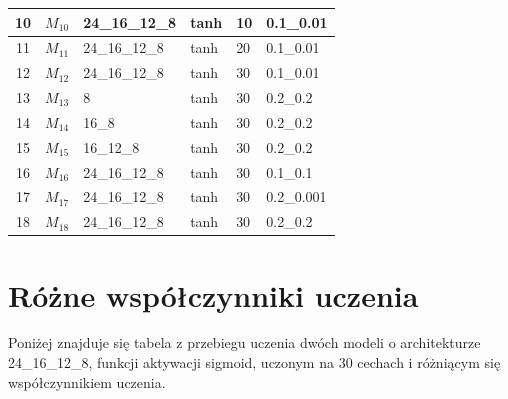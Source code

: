 \documentclass{report}
\begin{document}
\begin{minipage}{\textwidth}
\begin{longtable}{|c|l|l|l|l|l|}
                     10 & $M_{10}$ & 24\_16\_12\_8 & tanh & 10 & 0.1\_0.01 \\ \hline
                     11 & $M_{11}$ & 24\_16\_12\_8 & tanh & 20 & 0.1\_0.01 \\ \hline
                     12 & $M_{12}$ & 24\_16\_12\_8 & tanh & 30 & 0.1\_0.01 \\ \hline

                     13 & $M_{13}$ & 8 & tanh & 30 & 0.2\_0.2 \\ \hline
                     14 & $M_{14}$ & 16\_8 & tanh & 30 & 0.2\_0.2 \\ \hline
                     15 & $M_{15}$ & 16\_12\_8 & tanh & 30 & 0.2\_0.2 \\ \hline

                     16 & $M_{16}$ & 24\_16\_12\_8 & tanh & 30 & 0.1\_0.1 \\ \hline
                     17 & $M_{17}$ & 24\_16\_12\_8 & tanh & 30 & 0.2\_0.001 \\ \hline
                     18 & $M_{18}$ & 24\_16\_12\_8 & tanh & 30 & 0.2\_0.2 \\ \hline
                 \end{longtable}
    \end{minipage}

    \section{Różne współczynniki uczenia}\label{sec:rozneWspolczynnikiUczenia}

    Poniżej znajduje się tabela z przebiegu uczenia dwóch modeli o architekturze 24\_16\_12\_8, funkcji aktywacji sigmoid, uczonym na 30 cechach i różniącym się współczynnikiem uczenia.
\end{document}
